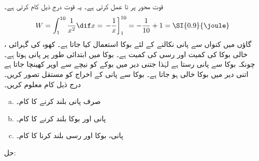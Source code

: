 قوت  محور  پر  تا  عمل کرتی ہے۔ یہ قوت درج ذیل کام کرتی ہے۔
\begin{align*}
W=\int_1^{10}\frac{1}{x^2}\dif x=\left.-\frac{1}{x}\right]_1^{10}=-\frac{1}{10}+1=\SI{0.9}{\joule}
\end{align*}
گاؤں میں کنواں سے پانی نکالنے کے لئے بوکا استعمال کیا جاتا ہے۔ کھوہ کی گہرائی ، خالی بوکا کی کمیت  اور رسی کی کمیت  ہے۔ بوکا میں ابتدائی طور پر  پانی ہوتا ہے۔چونکہ بوکا سے پانی رستا ہے لہٰذا جتنی دیر میں بوکے کو نیچے سے اوپر کھینچا جاتا ہے اتنی دیر میں بوکا خالی ہو جاتا ہے۔ بوکا سے پانی کے اخراج کو مستقل تصور کریں۔ درج ذیل کام معلوم کریں۔ 
\begin{enumerate}[a.]
\item
صرف پانی بلند کرنے کا کام۔
\item
پانی اور بوکا بلند کرنے کا کام۔
\item
پانی، بوکا اور رسی بلند کرنا کا کام۔
\end{enumerate}
حل:\quad

